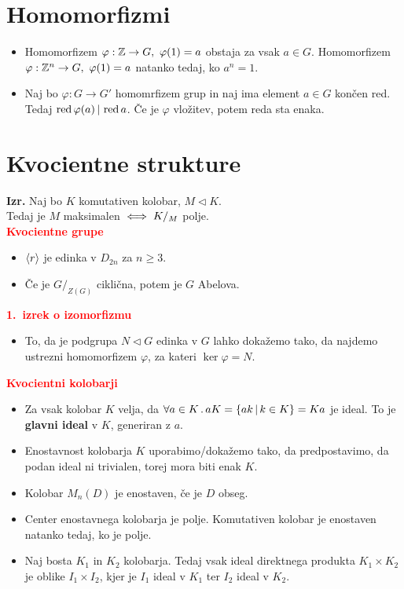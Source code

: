 \documentclass[a4paper,oneside,8pt,landscape]{extarticle}
\begin{document}
\begin{multicols*}{3}
\section{Homomorfizmi}
\begin{itemize}
    \item Homomorfizem \(\varphi: \Z \to G, \ \varphi(1) = a\) obstaja za vsak \(a \in G\). Homomorfizem \(\varphi: \Z^n \to G, \ \varphi(1) = a\) natanko tedaj, ko \(a^n = 1\).
    \item Naj bo \(\varphi: G \to G'\) homomrfizem grup in naj ima element \(a \in G\) končen red. Tedaj \(\operatorname{red} \varphi(a) \, | \, \operatorname{red} a\). Če je \(\varphi\) vložitev, potem reda sta enaka.
\end{itemize}
%
%
\section{Kvocientne strukture}
\textbf{Izr.} Naj bo \(K\) komutativen kolobar, \(M \triangleleft K\).\\ Tedaj je \(M\) maksimalen \(\iff K/_M\) polje.\\
%
%
\textbf{\textcolor{red}{Kvocientne grupe}}
\begin{itemize}
    \item \(\langle {r} \rangle\) je edinka v \(D_{2n}\) za \(n \geq 3\).
    \item Če je \(G/_{Z(G)}\) ciklična, potem je \(G\) Abelova.
\end{itemize}
%
%
\textbf{\textcolor{red}{1.\ izrek o izomorfizmu}}
\begin{itemize}
    \item To, da je podgrupa \(N \triangleleft G\) edinka v \(G\) lahko dokažemo tako, da najdemo ustrezni homomorfizem \(\varphi\), za kateri \(\ker \varphi = N\).
\end{itemize}
%
%
\textbf{\textcolor{red}{Kvocientni kolobarji}}
\begin{itemize}
    \item Za vsak kolobar \(K\) velja, da \(\forall a \in K \,.\, aK = \{ak \,|\, k \in K\} = Ka\) je ideal. To je \textbf{glavni ideal} v \(K\), generiran z \(a\).
    \item Enostavnost kolobarja \(K\) uporabimo/dokažemo tako, da predpostavimo, da podan ideal ni trivialen, torej mora biti enak \(K\).
    \item Kolobar \(M_n(D)\) je enostaven, če je \(D\) obseg.
    \item Center enostavnega kolobarja je polje. Komutativen kolobar je enostaven natanko tedaj, ko je polje.
    \item Naj bosta \(K_1\) in \(K_2\) kolobarja. Tedaj vsak ideal direktnega produkta \(K_1 \times K_2\) je oblike \(I_1 \times I_2\), kjer je \(I_1\) ideal v \(K_1\) ter \(I_2\) ideal v \(K_2\).
\end{itemize}
%
%

\end{multicols*}
\end{document}
